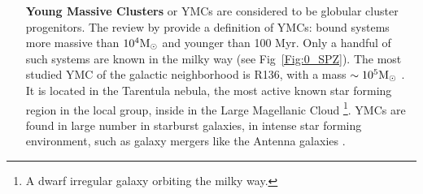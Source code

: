 \begin{itemize}
\item[\textbf{Young Massive Clusters}] or YMCs are considered to be globular cluster progenitors. The review by \cite{PortegiesZwart2010} provide a definition of YMCs: bound systems more massive than $10^4 {\textrm{M}_\odot}$ and younger than 100 Myr. Only a handful of such systems are known in the milky way (see Fig~\ref{Fig:0_SPZ}). The most studied YMC of the galactic neighborhood is R136, with a mass $\sim 10^5 {\textrm{M}_\odot}$ \citep{Andersen2009}. It is located in the Tarentula nebula, the most active known star forming region in the local group, inside in the Large Magellanic Cloud \footnote{A dwarf irregular galaxy orbiting the milky way.}. YMCs are found in large number in starburst galaxies, in intense star forming environment, such as galaxy mergers like the Antenna galaxies \citep{Whitmore2010}.

\end{itemize}








%


%


